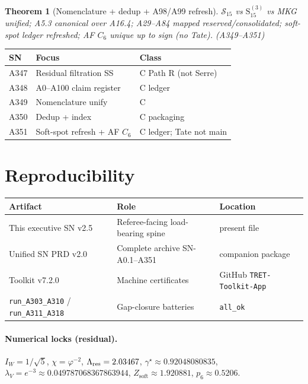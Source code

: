 \documentclass[11pt,a4paper]{article}
\newtheorem{theorem}{Theorem}
\theoremstyle{remark}
\begin{document}
\begin{theorem}[Nomenclature + dedup + A98/A99 refresh]
$\mathcal{S}_{15}$ vs $\mathrm{S}_{15}^{(3)}$ vs MKG unified; A5.3 canonical over A16.4; A29--A84 mapped reserved/consolidated; soft-spot ledger refreshed; AF $C_6$ unique up to sign (no Tate). (A349--A351)
\end{theorem}

\begin{center}
\begin{tabular}{@{}llp{6cm}@{}}
\toprule
SN & Focus & Class \\
\midrule
A347 & Residual filtration SS & C Path R (not Serre) \\
A348 & A0--A100 claim register & C ledger \\
A349 & Nomenclature unify & C \\
A350 & Dedup + index & C packaging \\
A351 & Soft-spot refresh + AF $C_6$ & C ledger; Tate not main \\
\bottomrule
\end{tabular}
\end{center}

\section{Reproducibility}
\label{sec:repro}

\begin{center}
\begin{tabular}{@{}llp{5.5cm}@{}}
\toprule
\textbf{Artifact} & \textbf{Role} & \textbf{Location} \\
\midrule
This executive SN v2.5 & Referee-facing load-bearing spine & present file \\
Unified SN PRD v2.0 & Complete archive SN-A0.1--A351 & companion package \\
Toolkit v7.2.0 & Machine certificates & GitHub \texttt{TRET-Toolkit-App} \\
\texttt{run\_A303\_A310} / \texttt{run\_A311\_A318} & Gap-closure batteries & \texttt{all\_ok} \\
\bottomrule
\end{tabular}
\end{center}

\paragraph{Numerical locks (residual).}
$I_W=1/\sqrt{5}$, $\chi=\varphi^{-2}$, $\Lambda_{\rm res}=2.03467$, $\gamma^\star\approx 0.92048080835$, $\lambda_V=e^{-3}\approx 0.049787068367863944$, $Z_{\mathrm{soft}}\approx 1.920881$, $p_6\approx 0.5206$.
\end{document}
